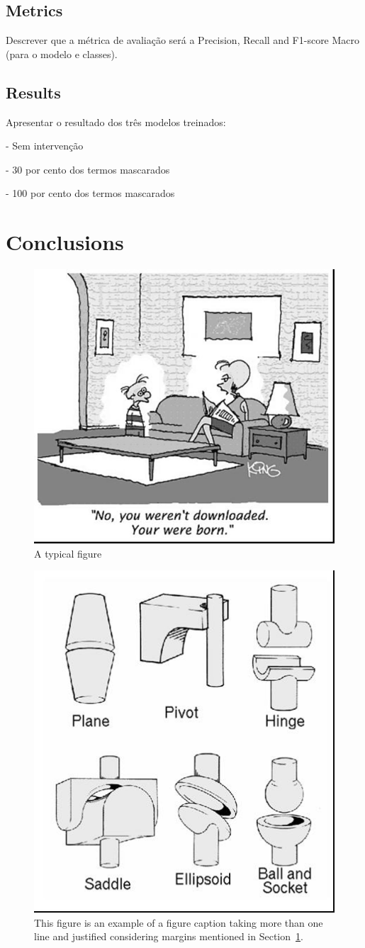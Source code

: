 \documentclass[12pt]{article}
\begin{document}
\subsection{Metrics}
Descrever que a métrica de avaliação será a Precision, Recall and F1-score Macro (para o modelo e classes).

\subsection{Results}
Apresentar o resultado dos três modelos treinados:

- Sem intervenção

- 30 por cento dos termos mascarados

- 100 por cento dos termos mascarados


\section{Conclusions}\label{sec:figs}


\begin{figure}[ht]
\centering
\includegraphics[width=.5\textwidth]{img/fig1.jpg}
\caption{A typical figure}
\label{fig:exampleFig1}
\end{figure}

\begin{figure}[ht]
\centering
\includegraphics[width=.3\textwidth]{img/fig2.jpg}
\caption{This figure is an example of a figure caption taking more than one
  line and justified considering margins mentioned in Section~\ref{sec:figs}.}
\label{fig:exampleFig2}
\end{figure}
\end{document}
